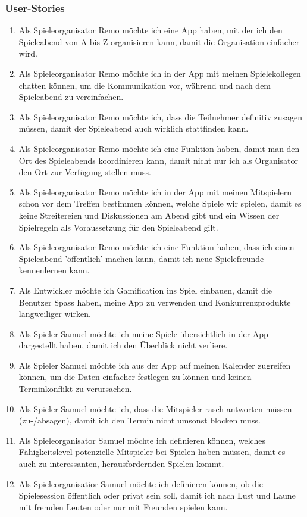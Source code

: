 \subsubsection{User-Stories}
\begin{enumerate}
\item Als Spieleorganisator Remo möchte ich eine App haben, mit der ich den Spieleabend von A bis Z organisieren kann, damit die Organisation einfacher wird.
\item Als Spieleorganisator Remo möchte ich in der App mit meinen Spielekollegen chatten können, um die Kommunikation vor, während und nach dem Spieleabend zu vereinfachen.
\item Als Spieleorganisator Remo möchte ich, dass die Teilnehmer definitiv zusagen müssen, damit der Spieleabend auch wirklich stattfinden kann.
\item Als Spieleorganisator Remo möchte ich eine Funktion haben, damit man den Ort des Spieleabends koordinieren kann, damit nicht nur ich als Organisator den Ort zur Verfügung stellen muss.
\item Als Spieleorganisator Remo möchte ich in der App mit meinen Mitspielern schon vor dem Treffen bestimmen können, welche Spiele wir spielen, damit es keine Streitereien und Diskussionen am Abend gibt und ein Wissen der Spielregeln als Voraussetzung für den Spieleabend gilt.
\item Als Spieleorganisator Remo möchte ich eine Funktion haben, dass ich einen Spieleabend 'öffentlich' machen kann, damit ich neue Spielefreunde kennenlernen kann.
\item Als Entwickler möchte ich Gamification ins Spiel einbauen, damit die Benutzer Spass haben, meine App zu verwenden und Konkurrenzprodukte langweiliger wirken.
\item Als Spieler Samuel möchte ich meine Spiele übersichtlich in der App dargestellt haben, damit ich den Überblick nicht verliere.
\item Als Spieler Samuel möchte ich aus der App auf meinen Kalender zugreifen können, um die Daten einfacher festlegen zu können und keinen Terminkonflikt zu verursachen.
\item Als Spieler Samuel möchte ich, dass die Mitspieler rasch antworten müssen (zu-/absagen), damit ich den Termin nicht umsonst blocken muss.
\item Als Spieleorganisator Samuel möchte ich definieren können, welches Fähigkeitslevel potenzielle Mitspieler bei Spielen haben müssen, damit es auch zu interessanten, herausfordernden Spielen kommt.
\item Als Spieleorganisatior Samuel möchte ich definieren können, ob die Spielesession öffentlich oder privat sein soll, damit ich nach Lust und Laune mit fremden Leuten oder nur mit Freunden spielen kann.
\end{enumerate}


